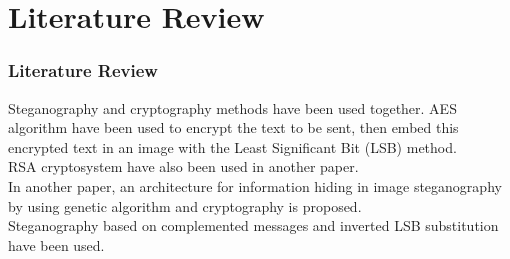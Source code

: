 \documentclass[12pt,hyperref={unicode}]{beamer}
\begin{document}

\section{Literature Review}
\begin{frame}
\frametitle{Literature Review}
Steganography and cryptography methods have been used  together. AES algorithm  have been used to encrypt the text to be sent, then embed this encrypted text in an image with the Least Significant Bit (LSB) method.\\\pause
RSA cryptosystem have also been used in another paper. \\\pause
In another paper, an architecture for information hiding in image steganography by using genetic algorithm and cryptography is proposed.\\\pause
Steganography based on complemented messages and inverted LSB substitution have been used.\\

\end{frame}


\end{document}
